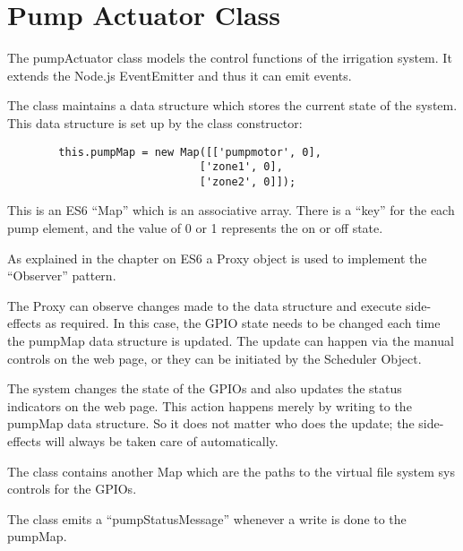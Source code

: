 %
%
%

\chapter{Pump Actuator Class}

The pumpActuator class models the control functions of the irrigation system.  
It extends the Node.js EventEmitter and thus it can emit events.

The class maintains a data structure which stores the current state of the 
system.  This data structure is set up by the class constructor:

\begin{verbatim}
        this.pumpMap = new Map([['pumpmotor', 0],
                              ['zone1', 0],
                              ['zone2', 0]]);
\end{verbatim}

This is an ES6 ``Map'' which is an associative array.  There is a ``key'' for 
the each pump element, and the value of 0 or 1 represents the on or off state.

As explained in the chapter on ES6 a Proxy object is used to implement the 
``Observer'' pattern.

The Proxy can observe changes made to the data structure and execute 
side-effects as required.  In this case, the GPIO state needs to be changed 
each time the pumpMap data structure is updated.  The update can happen via the 
manual controls on the web page, or they can be initiated by the Scheduler 
Object.

The system changes the state of the GPIOs and also updates the status 
indicators on the web page.  This action happens merely by writing to the 
pumpMap data structure.  So it does not matter who does the update; the 
side-effects will always be taken care of automatically.

The class contains another Map which are the paths to the virtual file system 
sys controls for the GPIOs.

The class emits a ``pumpStatusMessage'' whenever a write is done to the pumpMap.